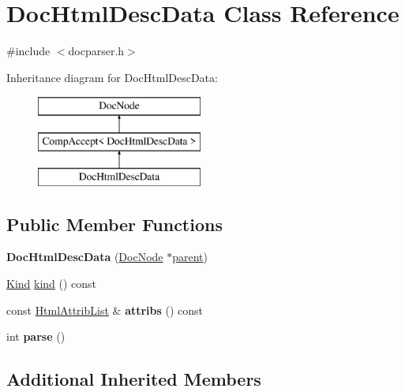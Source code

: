 \hypertarget{class_doc_html_desc_data}{}\section{Doc\+Html\+Desc\+Data Class Reference}
\label{class_doc_html_desc_data}


{\ttfamily \#include $<$docparser.\+h$>$}

Inheritance diagram for Doc\+Html\+Desc\+Data\+:\begin{figure}[H]
\begin{center}
\leavevmode
\includegraphics[height=3.000000cm]{class_doc_html_desc_data}
\end{center}
\end{figure}
\subsection*{Public Member Functions}
\begin{DoxyCompactItemize}
\item 
\mbox{\label{class_doc_html_desc_data_ae326119d544a16082f417b43abe3b6b5}} 
{\bfseries Doc\+Html\+Desc\+Data} (\mbox{\hyperlink{class_doc_node}{Doc\+Node}} $\ast$\mbox{\hyperlink{class_doc_node_a73e8ad29a91cfceb0968eb00db71a23d}{parent}})
\item 
\mbox{\hyperlink{class_doc_node_aebd16e89ca590d84cbd40543ea5faadb}{Kind}} \mbox{\hyperlink{class_doc_html_desc_data_a2ed43e5b814b9659e22be4569babebad}{kind}} () const
\item 
\mbox{\label{class_doc_html_desc_data_ac9c51058791e65bd685932f8ed550a92}} 
const \mbox{\hyperlink{class_html_attrib_list}{Html\+Attrib\+List}} \& {\bfseries attribs} () const
\item 
\mbox{\label{class_doc_html_desc_data_ae3eeaf6df34a38595797546e019224b8}} 
int {\bfseries parse} ()
\end{DoxyCompactItemize}
\subsection*{Additional Inherited Members}


